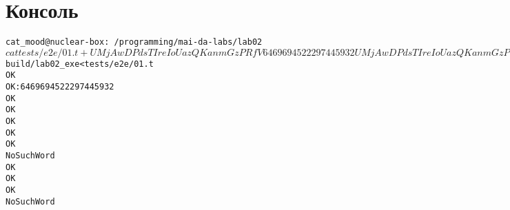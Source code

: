 \section{Консоль}
\begin{alltt}
cat_mood@nuclear-box:~/programming/mai-da-labs/lab02$ cat tests/e2e/01.t
+ UMjAwDPdsTIreIoUazQKanmGzPRfV 6469694522297445932
UMjAwDPdsTIreIoUazQKanmGzPRfV
+ eMjqiAsaEpQcSWszireOTdmxKodxZXaVgAOLtpjpPRSMrRHTbwbWdSqpyLvHMltcgXVhmZgEBs 2376015365768985450
+ CwByzdpKndACUO 3782028637663810452
+ bnNLoaZXzMwRndsZJySZQsDdVSwYgNjgmPlheYgTxJZDjgWQgmQmT 8041966132991934101
+ ahjH 2383040096089261832
+ gYpTihvBTqlcMhmyJHBqixheUJDLMmCIKJdBkaZzkbCTixusE 2087302814296979551
pMHaUSAjlOpryXlmoJITsjPAbhPYUJCm
+ svWDmUQhtlPHrRwJceWuQZekrwBaxNcCJJIWWG 8243555221965638719
+ UtKJMEZUCwOHAOKjtKofDpMUbmacFfkfvlXJT 1719112497809751096
- eMjqiAsaEpQcSWszireOTdmxKodxZXaVgAOLtpjpPRSMrRHTbwbWdSqpyLvHMltcgXVhmZgEBs
- asdsa
cat_mood@nuclear-box:~/programming/mai-da-labs/lab02$ build/lab02_exe < tests/e2e/01.t
OK
OK: 6469694522297445932
OK
OK
OK
OK
OK
NoSuchWord
OK
OK
OK
NoSuchWord
\end{alltt}
\pagebreak
